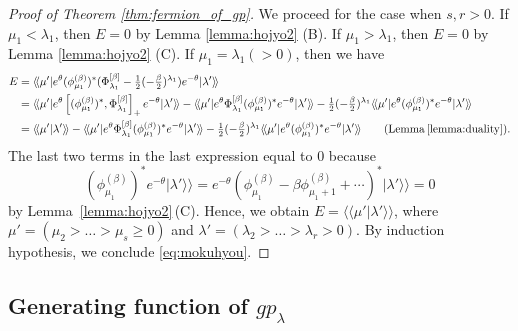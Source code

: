 \documentclass{amsart}
\def\kket#1{\vert #1 \rangle\!\rangle}
\def\bbra#1{\langle\!\langle #1 \vert}
\def\iinner#1#2{\langle\!\langle #1|#2\rangle\!\rangle}
\begin{document}
\begin{proof}[Proof of Theorem \ref{thm:fermion_of_gp}]
We proceed for the case when $s,r>0$.
If $\mu_1<\lambda_1$, then $E=0$ by Lemma \ref{lemma:hojyo2} (B).
If $\mu_1>\lambda_1$, then $E=0$ by Lemma \ref{lemma:hojyo2} (C).
If $\mu_1=\lambda_1(>0)$, then we have
\[
\begin{aligned}
E
&=
\bbra{\mu'}e^{\theta}(\phi^{(\beta)}_{\mu_1})^\ast
(\Phi^{[\beta]}_{\lambda_1}-\tfrac{1}{2}(-\tfrac{\beta}{2})^{\lambda_1})e^{-\theta}\kket{\lambda'}\\
&=
\bbra{\mu'}e^{\theta}
\left[
(\phi^{(\beta)}_{\mu_1})^\ast,
\Phi^{[\beta]}_{\lambda_1}
\right]_+
e^{-\theta}\kket{\lambda'}
-
\bbra{\mu'}e^{\theta}
\Phi^{[\beta]}_{\lambda_1}
(\phi^{(\beta)}_{\mu_1})^\ast
e^{-\theta}\kket{\lambda'}
-\tfrac{1}{2}(-\tfrac{\beta}{2})^{\lambda_1}
\bbra{\mu'}e^{\theta}
(\phi^{(\beta)}_{\mu_1})^\ast
e^{-\theta}\kket{\lambda'}\\
&
=
\iinner{\mu'}{\lambda'}
-
\bbra{\mu'}e^{\theta}
\Phi^{[\beta]}_{\lambda_1}
(\phi^{(\beta)}_{\mu_1})^\ast
e^{-\theta}\kket{\lambda'}
-\tfrac{1}{2}(-\tfrac{\beta}{2})^{\lambda_1}
\bbra{\mu'}e^{\theta}
(\phi^{(\beta)}_{\mu_1})^\ast
e^{-\theta}\kket{\lambda'}
\qquad 
(\mathrm{Lemma\,\ref{lemma:duality}}).
\end{aligned}
\]
The last two terms in the last expression equal to $0$ because
\[
(\phi^{(\beta)}_{\mu_1})^\ast
e^{-\theta}\kket{\lambda'}=
e^{-\theta}
(\phi^{(\beta)}_{\mu_1}-\beta \phi^{(\beta)}_{\mu_1+1}+\cdots)^\ast
\kket{\lambda'}
=
0
\]
by Lemma~\ref{lemma:hojyo2}\,(C).
Hence, we obtain $E=\iinner{\mu'}{\lambda'}$, where
$\mu'=(\mu_2>\dots>\mu_s\geq 0)$ and $\lambda'=(\lambda_2>\dots>\lambda_r>0)$.
By induction hypothesis, we conclude \eqref{eq:mokuhyou}.
\end{proof}



\subsection{Generating function of $gp_\lambda$}
\end{document}
